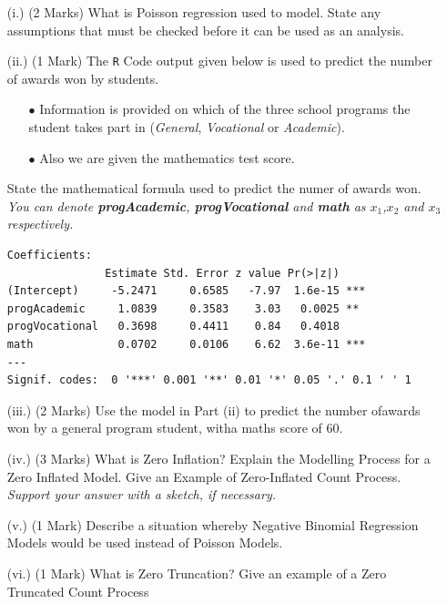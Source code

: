 \documentclass[a4paper,12pt]{article}
\begin{document}
\begin{itemize}
	\item[(i.)] (2 Marks)
	What is Poisson regression used to model. State any assumptions that must be checked before it can be used as an analysis.
%
	
	\item[(ii.)] (1 Mark) The \texttt{R} Code output given below is used to predict the number of awards won by students. \begin{itemize} 
		\item[$\bullet$] Information is provided on which of the three school programs the student takes part in (\textit{General}, \textit{Vocational} or \textit{Academic}). 
		\item[$\bullet$] Also we are given the mathematics test score.
		\end{itemize}
		State the mathematical formula used to predict the numer of awards won.\\
\textit{You can denote \textbf{progAcademic}, \textbf{progVocational} and \textbf{math} as $x_1$,$x_2$ and $x_3$ respectively.}


\begin{framed}
\begin{verbatim}
Coefficients:
               Estimate Std. Error z value Pr(>|z|)    
(Intercept)     -5.2471     0.6585   -7.97  1.6e-15 ***
progAcademic     1.0839     0.3583    3.03   0.0025 ** 
progVocational   0.3698     0.4411    0.84   0.4018    
math             0.0702     0.0106    6.62  3.6e-11 ***
---
Signif. codes:  0 '***' 0.001 '**' 0.01 '*' 0.05 '.' 0.1 ' ' 1

\end{verbatim}
\end{framed}
	
	\item[(iii.)] (2 Marks) Use the model in Part (ii) to predict the number ofawards won by a general program student, witha maths score of 60.
	

	\item[(iv.)] (3 Marks)
	What is Zero Inflation? Explain the Modelling Process for a Zero Inflated Model. Give an Example of Zero-Inflated Count Process. \textit{Support your answer with a sketch, if necessary.	}
	

	\item[(v.)] (1 Mark) Describe a situation whereby Negative Binomial Regression Models would be used instead of Poisson Models.
	

	
	\item[(vi.)] (1 Mark) 	What is Zero Truncation? Give an example of a Zero Truncated Count Process
\end{itemize}
\end{document}
